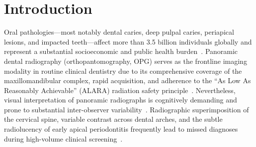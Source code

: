 \documentclass[review]{elsarticle}
\begin{document}
\linenumbers

\section{Introduction}
Oral pathologies---most notably dental caries, deep pulpal caries, periapical lesions, and impacted teeth---affect more than 3.5 billion individuals globally and represent a substantial socioeconomic and public health burden~\cite{petersen2003world, pitts2017dental}. Panoramic dental radiography (orthopantomography, OPG) serves as the frontline imaging modality in routine clinical dentistry due to its comprehensive coverage of the maxillomandibular complex, rapid acquisition, and adherence to the ``As Low As Reasonably Achievable'' (ALARA) radiation safety principle~\cite{farman2005alara, horner2013selection}. Nevertheless, visual interpretation of panoramic radiographs is cognitively demanding and prone to substantial inter-observer variability~\cite{meurer2021panoramic}. Radiographic superimposition of the cervical spine, variable contrast across dental arches, and the subtle radiolucency of early apical periodontitis frequently lead to missed diagnoses during high-volume clinical screening~\cite{white2014oral, schwendicke2019convolutional}.
\end{document}
